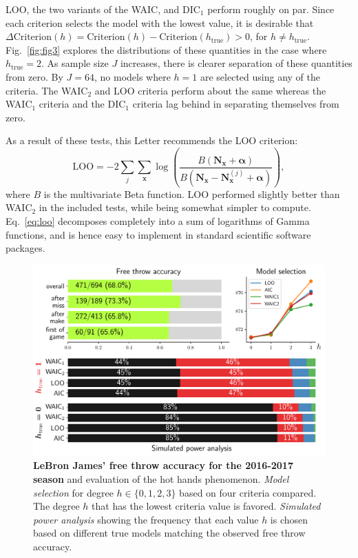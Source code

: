 \documentclass[prl,twocolumn,groupedaddress]{revtex4-1}
\newcommand{\bN}{\mathbf{N}}
\newcommand{\bx}{\mathbf{x}}
\newcommand{\balpha}{{\boldsymbol\alpha}}
\begin{document}
LOO, the two variants of the WAIC,  and DIC$_1$ perform roughly on par. Since each criterion selects the model with the lowest value, it is desirable that $\Delta\textrm{Criterion}(h)=\textrm{Criterion}(h)-\textrm{Criterion}(h_{\textrm{true}})>0$, for $h\neq h_{\textrm{true}}$. Fig.~\ref{fig:fig3} explores the distributions of these quantities in the case where $h_{\textrm{true}}=2$.  As sample size $J$ increases, there is clearer separation of these quantities from zero. By $J=64$, no models where $h=1$ are selected using any of the criteria. The WAIC$_2$ and LOO criteria perform about the same whereas the WAIC$_1$ criteria and the DIC$_1$ criteria lag behind in separating themselves from zero.


As a result of these tests, this Letter recommends the LOO criterion:
\begin{equation}
\textrm{LOO} = -2\sum_j \sum_{\bx}  \log\left(  \frac{B(\bN_\bx  +\balpha)}{B(\bN_\bx -\bN_{\bx}^{(j)} +\balpha)} \right),
\label{eq:loo}
\end{equation}
where $B$ is the multivariate Beta function. LOO performed slightly better than WAIC$_2$ in the included tests, while being somewhat simpler to compute. Eq.~\ref{eq:loo} decomposes completely into a sum of logarithms of Gamma functions, and is hence easy to implement in standard scientific software packages.

\begin{figure}
\includegraphics[width=\linewidth]{fig4}
\caption{\textbf{LeBron James' free throw accuracy for the 2016-2017 season} and evaluation of the hot hands phenomenon. \emph{Model selection} for degree $h\in\{0,1,2,3\}$ based on four criteria compared. The degree $h$ that has the lowest criteria value is favored. \emph{Simulated power analysis} showing the frequency that each value $h$ is chosen based on different true models matching the observed free throw accuracy. }
\label{fig:freethrows}
\end{figure}
\end{document}
